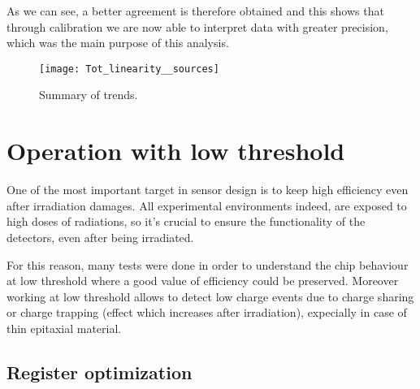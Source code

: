 As we can see, a better agreement is therefore obtained and this shows that through calibration we are now able to interpret data with greater precision, which was the main purpose of this analysis.

\begin{figure}[h!]
\centering
\texttt{[image: Tot\_linearity\_\_sources]}
\caption{Summary of trends.}
\label{inj_cap_sum}
\end{figure}


\section{Operation with low threshold}

One of the most important target in sensor design is to keep high efficiency even after irradiation damages. All experimental environments indeed, are exposed to high doses of radiations, so it's crucial to ensure the functionality of the detectors, even after being irradiated.

For this reason, many tests were done in order to understand the chip behaviour at low threshold where a good value of efficiency could be preserved.
Moreover working at low threshold allows to detect low charge events due to charge sharing or charge trapping (effect which increases after irradiation), expecially in case of thin epitaxial material. 


\begin{comment}
4. Explored also different registers settings to operate the chip with lower THResholds
 	- important after radiation damage to run at low THR to keep the hit efficiency high
5. Discovered & investigated an important issue with cross talk, due to digital signal from the redout, showing up when running the chip with THR below ~ 250 e- 
hot pixel studied to understand which digital signal was responsible & mitigate the effect with different settings/bias

Explain the function of the various registers used (see Eleonora thesis, and maybe can 		add also some scope picture). 
	Register optimization (conversion???)
	Comparison with simulation 
	Can add at the end some nice picture of the optimized thr and tuning 

\end{comment}


\subsection{Register optimization}

